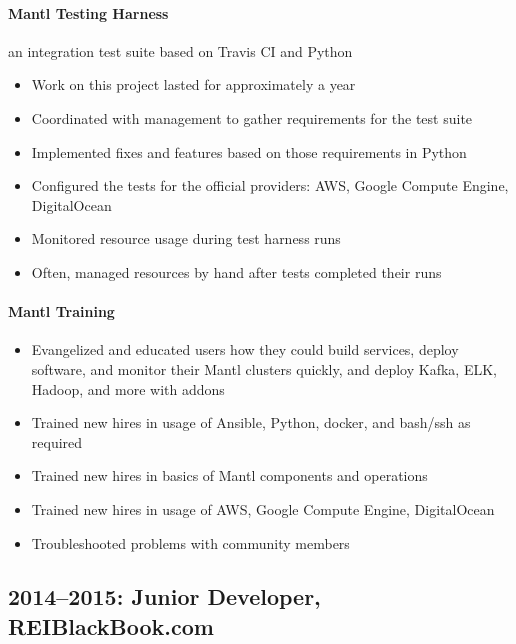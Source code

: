 \documentclass[11pt]{article}
\begin{document}
\paragraph{Mantl Testing Harness} an integration test suite based on Travis CI and Python
\begin{itemize}[noitemsep,leftmargin=1em]
	\item Work on this project lasted for approximately a year
	\item Coordinated with management to gather requirements for the test suite
	\item Implemented fixes and features based on those requirements in Python
	\item Configured the tests for the official providers: AWS, Google Compute Engine, DigitalOcean
	\item Monitored resource usage during test harness runs
	\item Often, managed resources by hand after tests completed their runs
\end{itemize}

\paragraph{Mantl Training}
\begin{itemize}[noitemsep,leftmargin=1em]
	\item Evangelized and educated users how they could build services, deploy software, and monitor their Mantl clusters quickly, and deploy Kafka, ELK, Hadoop, and more with addons
	\item Trained new hires in usage of Ansible, Python, docker, and bash/ssh as required
	\item Trained new hires in basics of Mantl components and operations
	\item Trained new hires in usage of AWS, Google Compute Engine, DigitalOcean
	\item Troubleshooted problems with community members
\end{itemize}

\subsection*{2014--2015: Junior Developer, REIBlackBook.com}
\end{document}

